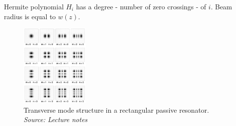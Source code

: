 Hermite polynomial $H_i$ has a degree - number of zero crossings - of $i$. Beam radius is equal to $w(z)$.
\begin{figure}[h!]
    \centering
    \includegraphics[width=0.3\textwidth]{slike/tmrr.png}
    \caption{Transverse mode structure in a rectangular passive resonator.\\ \textit{Source: Lecture notes}}
    \label{fig:tmrr}
\end{figure}



